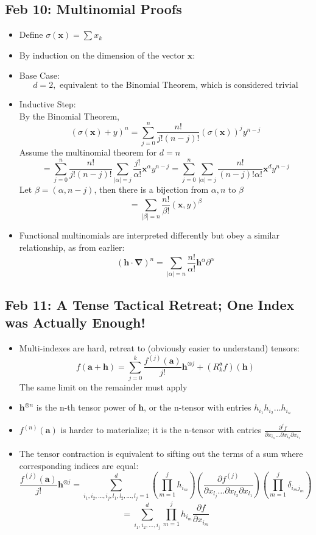 \documentclass[10pt, oneside]{article}
\newcommand{\del}{\partial}
\renewcommand{\vec}[1]{\mathbf{#1}}
\begin{document}
\subsection{Feb 10: Multinomial Proofs}
\begin{itemize}
    \item Define $\sigma(\vec{x}) = \sum x_k$
    \item By induction on the dimension of the vector $\vec{x}$:
    \item Base Case:
        \[d = 2, \text{ equivalent to the Binomial Theorem, which is considered trivial}\]
    \item Inductive Step:\\
        By the Binomial Theorem,
        \[(\sigma(\vec{x}) + y)^n = \sum_{j = 0}^n \frac{n!}{j!(n-j)!} (\sigma(\vec{x}))^j y^{n-j}\]
        Assume the multinomial theorem for $d = n$
        \[= \sum_{j = 0}^{n} \frac{n!}{j!(n-j)!} \sum_{|\alpha| = j} \frac{j!}{\alpha!} \vec{x}^\alpha y^{n-j} = \sum_{j = 0}^n \sum_{|\alpha| = j} \frac{n!}{(n-j)!\alpha!} \vec{x}^d y^{n-j}\]
        Let $\beta = (\alpha,n-j)$, then there is a bijection from $\alpha, n$ to $\beta$
        \[= \sum_{|\beta| = n} \frac{n!}{\beta!} (\vec{x},y)^\beta\]
    \item Functional multinomials are interpreted differently but obey a similar relationship, as from earlier:
        \[(\vec{h} \cdot \vec{\nabla})^n = \sum_{|\alpha| = n} \frac{n!}{\alpha!} \vec{h}^\alpha \del^\alpha\]
\end{itemize}

\subsection{Feb 11: A Tense Tactical Retreat; One Index was Actually Enough!}
\begin{itemize}
    \item Multi-indexes are hard, retreat to (obviously easier to understand) tensors:
        \[f(\vec{a} + \vec{h}) = \sum_{j = 0}^k \frac{f^{(j)} (\vec{a})}{j!} \vec{h}^{\otimes j} + (R_k^\vec{a} f)(\vec{h})\]
    The same limit on the remainder must apply
    \item $\vec{h}^{\otimes n}$ is the n-th tensor power of $\vec{h}$, or the n-tensor with entries $h_{i_1} h_{i_2} \hdots h_{i_n}$
    \item $f^{(n)}(\vec{a})$ is harder to materialize; it is the n-tensor with entries $\frac{\del^j f}{\del x_{i_n} \hdots \del x_{i_2} \del x_{i_1}}$
    \item The tensor contraction is equivalent to sifting out the terms of a sum where corresponding indices are equal:
        \[\frac{f^{(j)} (\vec{a})}{j!} \vec{h}^{\otimes j} = \! \! \! \! \! \! \! \! \! \! \! \! \! \! \! \!  \sum_{i_1,i_2,\hdots,i_j,l_1,l_2,\hdots,l_j = 1}^d \left( \prod_{m = 1}^j h_{i_m} \right) \left(\frac{\del f^{(j)}}{\del x_{l_j} \hdots \del x_{l_2} \del x_{l_1}}\right) \left( \prod_{m = 1}^{j} \delta_{i_m j_m}\right)\]
        \[= \sum_{i_1,i_2,\hdots,i_j}^d \prod_{m = 1}^j h_{i_m} \frac{\del f}{\del x_{i_m}}\]
\end{itemize}
\end{document}
